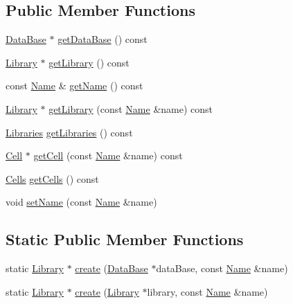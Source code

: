 \subsection*{Public Member Functions}
\begin{DoxyCompactItemize}
\item 
\hyperlink{classHurricane_1_1DataBase}{Data\+Base} $\ast$ \hyperlink{classHurricane_1_1Library_a657cbf1ac426ef6def0b5b51f80ed248}{get\+Data\+Base} () const
\item 
\hyperlink{classHurricane_1_1Library}{Library} $\ast$ \hyperlink{classHurricane_1_1Library_a5299d19afc96c535d557b86ba42eaa82}{get\+Library} () const
\item 
const \hyperlink{classHurricane_1_1Name}{Name} \& \hyperlink{classHurricane_1_1Library_a13a9c4d0c43e2e1df09b7c0ee59f577f}{get\+Name} () const
\item 
\hyperlink{classHurricane_1_1Library}{Library} $\ast$ \hyperlink{classHurricane_1_1Library_a8589e1ff3db5ef288c3027ceef28636b}{get\+Library} (const \hyperlink{classHurricane_1_1Name}{Name} \&name) const
\item 
\hyperlink{namespaceHurricane_a2868a53bbb0507710460ff02fab77cad}{Libraries} \hyperlink{classHurricane_1_1Library_a43b3703b939b7e70261d1f9319db2bb0}{get\+Libraries} () const
\item 
\hyperlink{classHurricane_1_1Cell}{Cell} $\ast$ \hyperlink{classHurricane_1_1Library_a2e6bb294c611db79e00a5a6ea00974d5}{get\+Cell} (const \hyperlink{classHurricane_1_1Name}{Name} \&name) const
\item 
\hyperlink{namespaceHurricane_a8b4ab14b26f36f43d83a50294410b44a}{Cells} \hyperlink{classHurricane_1_1Library_aae3e47aef08e50f9858fb79537f6eb41}{get\+Cells} () const
\item 
void \hyperlink{classHurricane_1_1Library_a1181e4e87f42749bdfda253cad658ea9}{set\+Name} (const \hyperlink{classHurricane_1_1Name}{Name} \&name)
\end{DoxyCompactItemize}
\subsection*{Static Public Member Functions}
\begin{DoxyCompactItemize}
\item 
static \hyperlink{classHurricane_1_1Library}{Library} $\ast$ \hyperlink{classHurricane_1_1Library_af304234d0347128300df5ad09801229d}{create} (\hyperlink{classHurricane_1_1DataBase}{Data\+Base} $\ast$data\+Base, const \hyperlink{classHurricane_1_1Name}{Name} \&name)
\item 
static \hyperlink{classHurricane_1_1Library}{Library} $\ast$ \hyperlink{classHurricane_1_1Library_a36bc1af0e48307180be81a81d462650e}{create} (\hyperlink{classHurricane_1_1Library}{Library} $\ast$library, const \hyperlink{classHurricane_1_1Name}{Name} \&name)
\end{DoxyCompactItemize}


